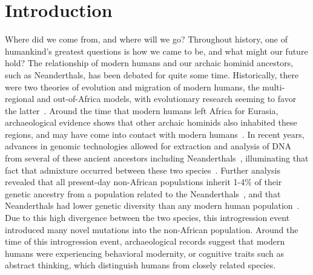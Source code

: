 
\chapter{Introduction}

Where did we come from, and where will we go? Throughout history, one of humankind's greatest questions is how we came to be, and what might our future hold? 
The relationship of modern humans and our archaic hominid ancestors, such as Neanderthals, has been debated for quite some time. Historically, there were two theories of evolution and migration of modern humans, the multi-regional and out-of-Africa models, with evolutionary research seeming to favor the latter~\cite{ramachandran2005support}. Around the time that modern humans left Africa for Eurasia, archaeological evidence shows that other archaic hominids also inhabited these regions, and may have come into contact with modern humans~\cite{benazzi2011early}. In recent years, advances in genomic technologies allowed for extraction and analysis of DNA from several of these ancient ancestors including Neanderthals~\cite{green2010,reich2010genetic,prfer2014complete}, illuminating that fact that admixture occurred between these two species~\cite{sankararaman2012date}. Further analysis revealed that all present-day non-African populations inherit 1-4\% of their genetic ancestry from a population related to the Neanderthals~\cite{green2010}, and that Neanderthals had lower genetic diversity than any modern human population~\cite{prfer2014complete}.  Due to this high divergence between the two species, this introgression event introduced many novel mutations into the non-African population. Around the time of this introgression event, archaeological records suggest that modern humans were experiencing behavioral modernity, or cognitive traits such as abstract thinking, which distinguish humans from closely related species.

